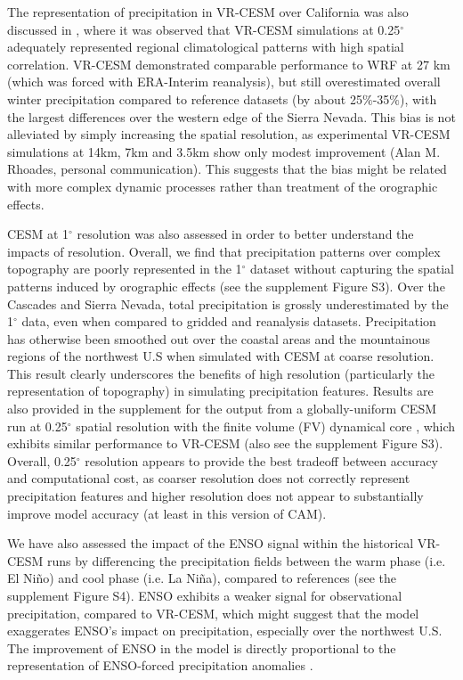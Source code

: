 The representation of precipitation in VR-CESM over California was also discussed in \cite{huang2016evaluation}, where it was observed that VR-CESM simulations at 0.25$^\circ$ adequately represented regional climatological patterns with high spatial correlation. VR-CESM demonstrated comparable performance to WRF at 27 km (which was forced with ERA-Interim reanalysis), but still overestimated overall winter precipitation compared to reference datasets (by about 25$\%$-35$\%$), with the largest differences over the western edge of the Sierra Nevada.  This bias is not alleviated by simply increasing the spatial resolution, as experimental VR-CESM simulations at 14km, 7km and 3.5km show only modest improvement (Alan M. Rhoades, personal communication).  This suggests that the bias might be related with more complex dynamic processes rather than treatment of the orographic effects. 



CESM at 1$^\circ$ resolution was also assessed in order to better understand the impacts of resolution. Overall, we find that precipitation patterns over complex topography are poorly represented in the 1$^\circ$ dataset without capturing the spatial patterns induced by orographic effects (see the supplement Figure S3).  Over the Cascades and Sierra Nevada, total precipitation is grossly underestimated by the 1$^\circ$ data, even when compared to gridded and reanalysis datasets. Precipitation has otherwise been smoothed out over the coastal areas and the mountainous regions of the northwest U.S when simulated with CESM at coarse resolution.  This result clearly underscores the benefits of high resolution (particularly the representation of topography) in simulating precipitation features.  Results are also provided in the supplement for the output from a globally-uniform CESM run at 0.25$^\circ$ spatial resolution with the finite volume (FV) dynamical core \cite{wehner2014effect}, which exhibits similar performance to VR-CESM (also see the supplement Figure S3).  Overall, 0.25$^\circ$ resolution appears to provide the best tradeoff between accuracy and computational cost, as coarser resolution does not correctly represent precipitation features and higher resolution does not appear to substantially improve model accuracy (at least in this version of CAM).


We have also assessed the impact of the ENSO signal within the historical VR-CESM runs by differencing the precipitation fields between the warm phase (i.e. El Ni\~no) and cool phase (i.e. La Ni\~na), compared to references (see the supplement Figure S4). ENSO exhibits a weaker signal for observational precipitation, compared to VR-CESM, which might suggest that the model exaggerates ENSO's impact on precipitation, especially over the northwest U.S. The improvement of ENSO in the model is directly proportional to the representation of ENSO-forced precipitation anomalies \cite{achutarao2006enso}.



